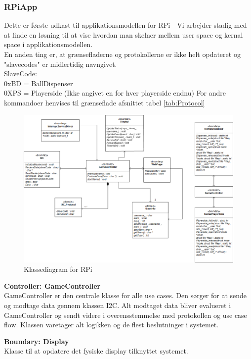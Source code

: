 \documentclass[Arkitektur/System_main.tex]{subfiles}
\begin{document}
\subsubsection{RPiApp}
Dette er første udkast til applikationsmodellen for RPi - Vi arbejder stadig med at finde en løsning til at vise hvordan man skelner mellem user space og kernal space i applikationsmodellen. 
\\En anden ting er, at grænsefladerne og protokollerne er ikke helt opdateret og "slavecodes" er midlertidig navngivet. 
\\SlaveCode:
\\0xBD = BallDispenser
\\0XPS = Playerside (Ikke angivet en for hver playerside endnu) 
For andre kommandoer henvises til grænseflade afsnittet tabel \ref{tab:Protocol}

\begin{figure}[H]
    \centering
    \includegraphics[width=\textwidth]{Arkitektur/Softwarearkitektur/Applikationsmodel/RPi/graphics_RPi/Class.png}
    \caption{Klassediagram for RPi}
    \label{fig:CD_RPI}
\end{figure}

\textbf{Controller:  GameController}\\
GameController er den centrale klasse for alle use cases. Den sørger for at sende og modtage data gennem klassen I2C. Alt modtaget data bliver evalueret i GameController og sendt videre i overensstemmelse med protokollen og use case flow. Klassen varetager alt logikken og de flest beslutninger i systemet. 

\textbf{Boundary:  Display}\\
Klasse til at opdatere det fysiske display tilknyttet systemet. 
\end{document}
